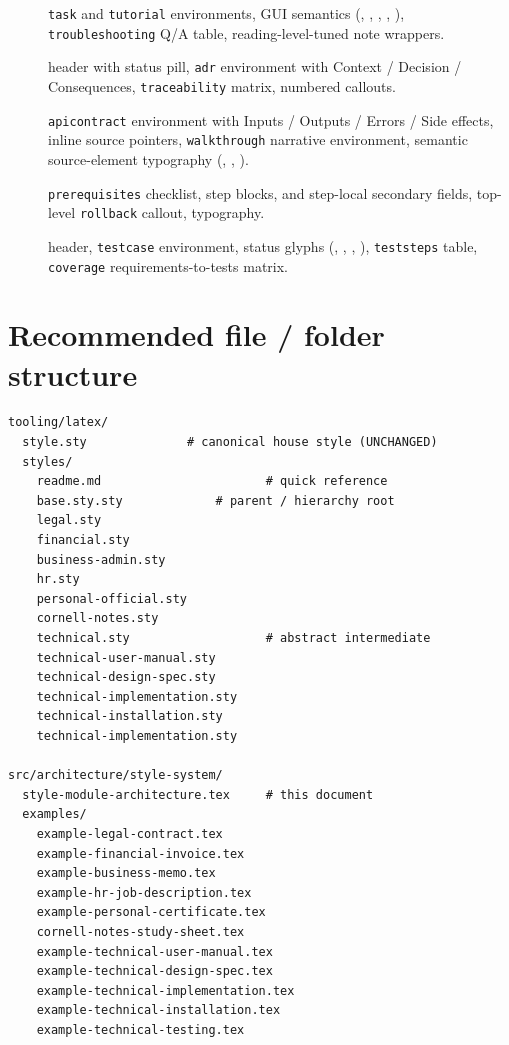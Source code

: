 \documentclass[11pt]{article}
\begin{document}
\begin{description}
  \item[] \texttt{task} and \texttt{tutorial}
    environments, GUI semantics (, ,
    , , ),
    \texttt{troubleshooting} Q/A table, reading-level-tuned note wrappers.
  \item[]  header with status
    pill, \texttt{adr} environment with Context / Decision / Consequences,
    \texttt{traceability} matrix, numbered 
    callouts.
  \item[] \texttt{apicontract} environment
    with Inputs / Outputs / Errors / Side effects, 
    inline source pointers, \texttt{walkthrough} narrative environment,
    semantic source-element typography (,
    , ).
  \item[] \texttt{prerequisites} checklist,
     step blocks,  and
     step-local secondary fields, top-level
    \texttt{rollback} callout,  typography.
  \item[]  header,
    \texttt{testcase} environment, status glyphs (,
    , , ),
    \texttt{teststeps} table, \texttt{coverage} requirements-to-tests
    matrix.
\end{description}

\section{Recommended file / folder structure}

\begin{verbatim}
tooling/latex/
  style.sty              # canonical house style (UNCHANGED)
  styles/
    readme.md                       # quick reference
    base.sty.sty             # parent / hierarchy root
    legal.sty
    financial.sty
    business-admin.sty
    hr.sty
    personal-official.sty
    cornell-notes.sty
    technical.sty                   # abstract intermediate
    technical-user-manual.sty
    technical-design-spec.sty
    technical-implementation.sty
    technical-installation.sty
    technical-implementation.sty

src/architecture/style-system/
  style-module-architecture.tex     # this document
  examples/
    example-legal-contract.tex
    example-financial-invoice.tex
    example-business-memo.tex
    example-hr-job-description.tex
    example-personal-certificate.tex
    cornell-notes-study-sheet.tex
    example-technical-user-manual.tex
    example-technical-design-spec.tex
    example-technical-implementation.tex
    example-technical-installation.tex
    example-technical-testing.tex
\end{verbatim}
\end{document}
